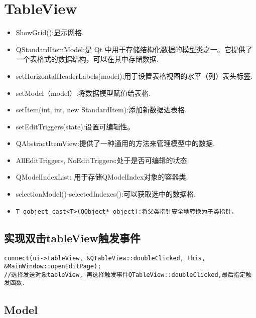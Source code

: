 \documentclass[11pt]{article}
\begin{document}
\section{TableView}
\begin{itemize}
\item ShowGrid():显示网格.
\item QStandardItemModel:是 Qt 中用于存储结构化数据的模型类之一。它提供了一个表格式的数据结构，可以在其中存储数据.
\item setHorizontalHeaderLabels(model):用于设置表格视图的水平（列）表头标签.
\item setModel（model）:将数据模型赋值给表格.
\item setItem(int, int, new StandardItem):添加新数据进表格.
\item setEditTriggers(state):设置可编辑性。
\item QAbstractItemView:提供了一种通用的方法来管理模型中的数据.
\item AllEditTriggers, NoEditTriggers:处于是否可编辑的状态.
\item QModelIndexList: 用于存储QModelIndex对象的容器类.
\item selectionModel()-selectedIndexes():可以获取选中的数据格.
\item 
\begin{verbatim}
T qobject_cast<T>(QObject* object):将父类指针安全地转换为子类指针，
\end{verbatim}
\end{itemize}



\subsection{实现双击tableView触发事件}
\begin{verbatim}
connect(ui->tableView, &QTableView::doubleClicked, this, &MainWindow::openEditPage);
//选择发送对象tableView, 再选择触发事件QTableView::doubleClicked,最后指定触发函数.
\end{verbatim}


\subsection{Model}
\end{document}
